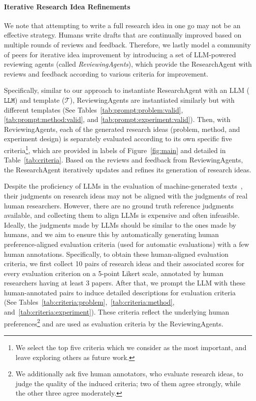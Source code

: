 \documentclass[11pt]{article}
\begin{document}
\paragraph{Iterative Research Idea Refinements}
We note that attempting to write a full research idea in one go may not be an effective strategy. Humans write drafts that are continually improved based on multiple rounds of reviews and feedback. Therefore, we lastly model a community of peers for iterative idea improvement by introducing a set of LLM-powered reviewing agents (called \emph{ReviewingAgents}), which provide the ResearchAgent with reviews and feedback according to various criteria for improvement.

Specifically, similar to our approach to instantiate ResearchAgent with an LLM ($\texttt{LLM}$) and template ($\mathcal{T}$), ReviewingAgents are instantiated similarly but with different templates (See Tables~\ref{tab:prompt:problem:valid}, \ref{tab:prompt:method:valid}, and \ref{tab:prompt:experiment:valid}). Then, with ReviewingAgents, each of the generated research ideas (problem, method, and experiment design) is separately evaluated according to its own specific five criteria\footnote{We select the top five criteria which we consider as the most important, and leave exploring others as future work.}, which are provided in labels of Figure~\ref{fig:main} and detailed in Table~\ref{tab:criteria}. Based on the reviews and feedback from ReviewingAgents, the ResearchAgent iteratively updates and refines its generation of research ideas.

Despite the proficiency of LLMs in the evaluation of machine-generated texts~\cite{LLM/Judge/1, LLM/Judge/2}, their judgments on research ideas may not be aligned with the judgments of real human researchers. However, there are no ground truth reference judgments available, and collecting them to align LLMs is expensive and often infeasible. Ideally, the judgments made by LLMs should be similar to the ones made by humans, and we aim to ensure this by automatically generating human preference-aligned evaluation criteria (used for automatic evaluations) with a few human annotations. Specifically, to obtain these human-aligned evaluation criteria, we first collect 10 pairs of research ideas and their associated scores for every evaluation criterion on a 5-point Likert scale, annotated by human researchers having at least 3 papers. After that, we prompt the LLM with these human-annotated pairs to induce detailed descriptions for evaluation criteria~\cite{lin2024interpretable} (See Tables~\ref{tab:criteria:problem},~\ref{tab:criteria:method}, and~\ref{tab:criteria:experiment}). These criteria reflect the underlying human preferences\footnote{We additionally ask five human annotators, who evaluate research ideas, to judge the quality of the induced criteria; two of them agree strongly, while the other three agree moderately.} and are used as evaluation criteria by the ReviewingAgents.
\end{document}
